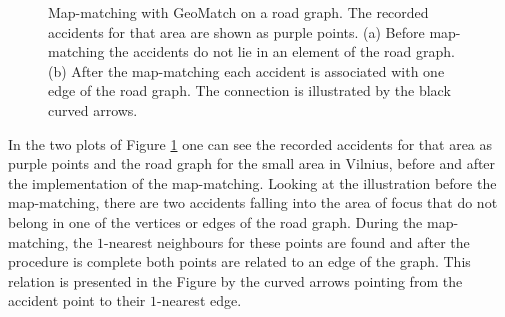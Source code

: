 \documentclass[12pt]{article}
\theoremstyle{definition}
\begin{document}
 \begin{figure}[!ht]
    \centering
    \qquad
    \caption{Map-matching with GeoMatch on a road graph. The recorded accidents for that area are shown as purple points. (a) Before map-matching the accidents do not lie in an element of the road graph. (b) After the map-matching each accident is associated with one edge of the road graph. The connection is illustrated by the black curved arrows.}%
    \label{fig:MapMatching}
\end{figure}

In the two plots of Figure \ref{fig:MapMatching} one can see the recorded accidents for that area as purple points and the road graph for the small area in Vilnius, before and after the implementation of the map-matching. Looking at the illustration before the map-matching, there are two accidents falling into the area of focus that do not belong in one of the vertices or edges of the road graph. During the map-matching, the $1$-nearest neighbours for these points are found and after the procedure is complete both points are related to an edge of the graph. This relation is presented in the Figure by the curved arrows pointing from the accident point to their $1$-nearest edge. 
\end{document}
